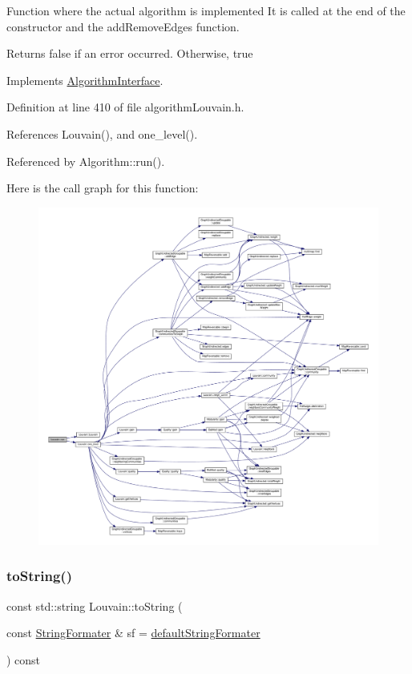 Function where the actual algorithm is implemented It is called at the end of the constructor and the add\+Remove\+Edges function. \begin{DoxyReturn}{Returns}
false if an error occurred. Otherwise, true 
\end{DoxyReturn}


Implements \hyperlink{classAlgorithmInterface_a0bafcdabd2b5fd45abe97af91e02ca14}{Algorithm\+Interface}.



Definition at line 410 of file algorithm\+Louvain.\+h.



References Louvain(), and one\+\_\+level().



Referenced by Algorithm\+::run().

Here is the call graph for this function\+:
\nopagebreak
\begin{figure}[H]
\begin{center}
\leavevmode
\includegraphics[width=350pt]{classLouvain_ad43da46797e9e0ed91dca7fefd428148_cgraph}
\end{center}
\end{figure}
\mbox{\label{classLouvain_aa5c1497cdc36d829b5782f3bc9b577e6}} 
\subsubsection{\texorpdfstring{to\+String()}{toString()}}
{\footnotesize\ttfamily const std\+::string Louvain\+::to\+String (\begin{DoxyParamCaption}\item[{const \hyperlink{classStringFormater}{String\+Formater} \&}]{sf = {\ttfamily \hyperlink{stringFormater_8h_acb8730b93a9ef8ba728f69e3405b975a}{default\+String\+Formater}} }\end{DoxyParamCaption}) const\hspace{0.3cm}{\ttfamily [inline]}}



